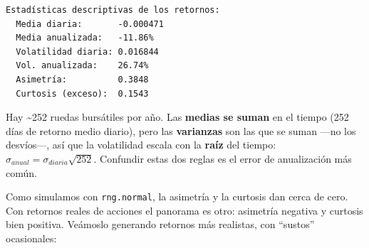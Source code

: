 \documentclass[
  spanish,
  letterpaper,
  DIV=11,
  numbers=noendperiod]{scrreprt}
\begin{document}
\begin{verbatim}
Estadísticas descriptivas de los retornos:
  Media diaria:       -0.000471
  Media anualizada:   -11.86%
  Volatilidad diaria: 0.016844
  Vol. anualizada:    26.74%
  Asimetría:          0.3848
  Curtosis (exceso):  0.1543
\end{verbatim}

\begin{tcolorbox}[enhanced jigsaw, bottomrule=.15mm, colback=white, opacitybacktitle=0.6, arc=.35mm, toprule=.15mm, opacityback=0, breakable, titlerule=0mm, left=2mm, coltitle=black, colbacktitle=quarto-callout-note-color!10!white, colframe=quarto-callout-note-color-frame, leftrule=.75mm, toptitle=1mm, bottomtitle=1mm, title=\textcolor{quarto-callout-note-color}{\faInfo}\hspace{0.5em}{¿Por qué ×252 y ×√252?}, rightrule=.15mm]

Hay \textasciitilde252 ruedas bursátiles por año. Las \textbf{medias se
suman} en el tiempo (252 días de retorno medio diario), pero las
\textbf{varianzas} son las que se suman ---no los desvíos---, así que la
volatilidad escala con la \textbf{raíz} del tiempo:
\(\sigma_{anual} = \sigma_{diaria}\sqrt{252}\). Confundir estas dos
reglas es el error de anualización más común.

\end{tcolorbox}

Como simulamos con \texttt{rng.normal}, la asimetría y la curtosis dan
cerca de cero. Con retornos reales de acciones el panorama es otro:
asimetría negativa y curtosis bien positiva. Veámoslo generando retornos
más realistas, con ``sustos'' ocasionales:
\end{document}
